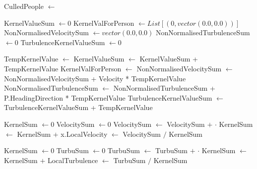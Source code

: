
\begin{center}
\label{alg:revised_algorithm}
\begin{algorithmic}[1]

    \State CulledPeople $\gets$  
    \State {}
\EndFor
\EndFunction



\State KernelValueSum $\gets 0$
\State KernelValForPerson $\gets List[(0,vector(0.0,0.0))]$ 
\State NonNormalisedVelocitySum $\gets vector(0.0,0.0)$
\State NonNormalisedTurbulenceSum $\gets 0$
\State TurbulenceKernelValueSum $\gets 0$ 


    \State TempKernelValue $\gets$ 
    \State KernelValueSum $\gets$ KernelValueSum + TempKernelValue
    \State KernelValForPerson $\gets$ 
    \State NonNormalisedVelocitySum $\gets$ NonNormalisedVelocitySum + Velocity * TempKernelValue
        \State NonNormalisedTurbulenceSum $\gets$ NonNormalisedTurbulenceSum + P.HeadingDirection * TempKernelValue
        \State TurbulenceKernelValueSum $\gets$ TurbulenceKernelValueSum + TempKernelValue
    \EndIf
\EndFor


    \State KernelSum $\gets 0$
    \State VelocitySum $\gets 0$
        \State VelocitySum $\gets$ VelocitySum $+$  $\cdot$ 
        \State KernelSum $\gets$ KernelSum $+$ 
    \EndFor
    \State x.LocalVelocity $\gets$ VelocitySum $/$ KernelSum
\EndFor

    \State KernelSum $\gets 0$
    \State TurbuSum $\gets 0$
        \State TurbuSum $\gets$ TurbuSum $+$  $\cdot$ 
        \State KernelSum $\gets$ KernelSum $+$ 
    \EndFor
    \State LocalTurbulence $\gets$ TurbuSum $/$ KernelSum
\EndFor


\end{algorithmic}
\end{center}
